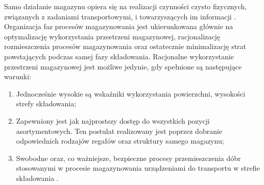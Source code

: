 	Samo działanie magazynu opiera się na realizacji czynności czysto fizycznych, związanych z zadaniami transportowymi, 
	i towarzyszących im informacji \cite{PZMW}. Organizacja faz procesów magazynowania jest ukierunkowana głównie na
	optymalizację wykorzystania przestrzeni magazynowej, racjonalizację rozmieszczenia procesów magazynowania oraz
	ostatecznie minimalizację strat powstających podczas samej fazy składowania. Racjonalne wykorzystanie
	przestrzeni magazynowej jest możliwe jedynie, gdy spełnione są następujące warunki:
	\begin{enumerate}
		\item Jednocześnie wysokie są wskaźniki wykorzystania powierzchni, wysokości strefy składowania;
		\item Zapewniony jest jak najprostszy dostęp do wszystkich pozycji asortymentowych. Ten postulat
		realizowany jest poprzez dobranie odpowiednich rodzajów regałów oraz struktury samego magazynu;
		\item Swobodne oraz, co ważniejsze, bezpieczne procesy przemieszczenia dóbr stosowanymi
		w procesie magazynowania urządzeniami do transportu w strefie składowania \cite{logistyka_w_przedsiebiorstwie}.
	\end{enumerate}